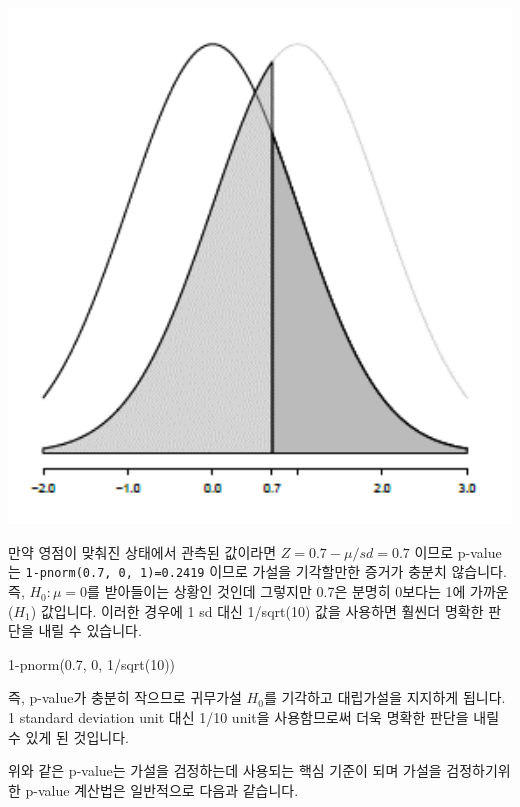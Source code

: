 \documentclass[
]{book}
\newenvironment{Shaded}{\begin{snugshade}}{\end{snugshade}}
\newcommand{\DecValTok}[1]{\textcolor[rgb]{0.00,0.00,0.81}{#1}}
\newcommand{\FloatTok}[1]{\textcolor[rgb]{0.00,0.00,0.81}{#1}}
\newcommand{\FunctionTok}[1]{\textcolor[rgb]{0.00,0.00,0.00}{#1}}
\newcommand{\NormalTok}[1]{#1}
\newcommand{\SpecialCharTok}[1]{\textcolor[rgb]{0.00,0.00,0.00}{#1}}
\begin{document}
\includegraphics[width=6.25in,height=\textheight]{./images/09/03.png}

만약 영점이 맞춰진 상태에서 관측된 값이라면 \(Z = {0.7-\mu}/sd = 0.7\) 이므로 p-value는 \texttt{1-pnorm(0.7,\ 0,\ 1)=0.2419} 이므로 가설을 기각할만한 증거가 충분치 않습니다. 즉, \(H_0: \mu=0\)를 받아들이는 상황인 것인데 그렇지만 0.7은 분명히 0보다는 1에 가까운 (\(H_1\)) 값입니다. 이러한 경우에 1 sd 대신 1/sqrt(10) 값을 사용하면 훨씬더 명확한 판단을 내릴 수 있습니다.

\begin{Shaded}
\begin{Highlighting}[]

\DecValTok{1}\SpecialCharTok{{-}}\FunctionTok{pnorm}\NormalTok{(}\FloatTok{0.7}\NormalTok{, }\DecValTok{0}\NormalTok{, }\DecValTok{1}\SpecialCharTok{/}\FunctionTok{sqrt}\NormalTok{(}\DecValTok{10}\NormalTok{))}
\end{Highlighting}
\end{Shaded}

즉, p-value가 충분히 작으므로 귀무가설 \(H_0\)를 기각하고 대립가설을 지지하게 됩니다. 1 standard deviation unit 대신 1/10 unit을 사용함므로써 더욱 명확한 판단을 내릴 수 있게 된 것입니다.

위와 같은 p-value는 가설을 검정하는데 사용되는 핵심 기준이 되며 가설을 검정하기위한 p-value 계산법은 일반적으로 다음과 같습니다.
\end{document}
